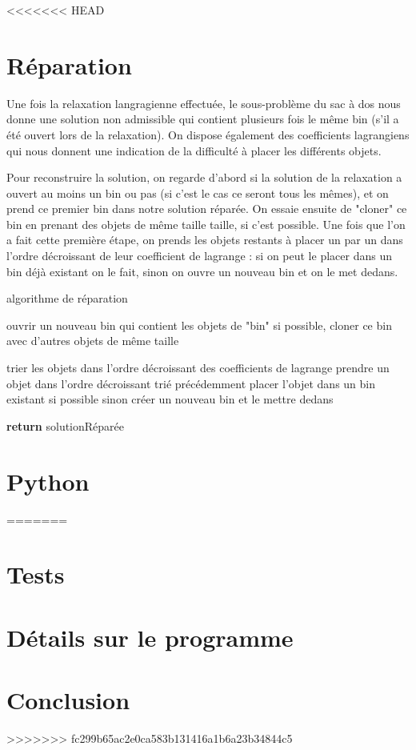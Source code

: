\documentclass{article}
\begin{document}
<<<<<<< HEAD
\section{Réparation}

Une fois la relaxation langragienne effectuée, le sous-problème du sac à dos nous donne une solution non admissible qui contient plusieurs fois le même bin (s'il a été ouvert lors de la relaxation). On dispose également des coefficients lagrangiens qui nous donnent une indication de la difficulté à placer les différents objets. 

Pour reconstruire la solution, on regarde d'abord si la solution de la relaxation a ouvert au moins un bin ou pas (si c'est le cas ce seront tous les mêmes), et on prend ce premier bin dans notre solution réparée. On essaie ensuite de "cloner" ce bin en prenant des objets de même taille taille, si c'est possible. Une fois que l'on a fait cette première étape, on prends les objets restants à placer un par un dans l'ordre décroissant de leur coefficient de lagrange : si on peut le placer dans un bin déjà existant on le fait, sinon on ouvre un nouveau bin et on le met dedans.

\begin{algorithm}
	\caption{algorithme de réparation}
	\begin{algorithmic}[1]
		\State ouvrir un nouveau bin qui contient les objets de "bin"
		\State si possible, cloner ce bin avec d'autres objets de même taille
		\EndIf
		
		\State trier les objets dans l'ordre décroissant des coefficients de lagrange
		\State prendre un objet dans l'ordre décroissant trié précédemment
		\State placer l'objet dans un bin existant si possible
		\State sinon créer un nouveau bin et le mettre dedans
		\EndWhile
		
		\State \textbf{return} solutionRéparée
		\EndFunction
	\end{algorithmic}
\end{algorithm}


\section{Python}
=======
\section{Tests}

\section{Détails sur le programme}

\section{Conclusion}
>>>>>>> fc299b65ac2e0ca583b131416a1b6a23b34844c5
\end{document}
